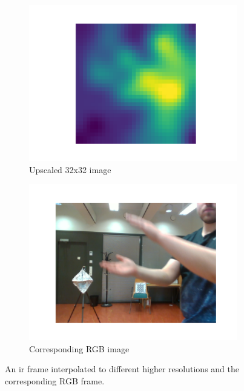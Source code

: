 \begin{figure}[H]
\begin{subfigure}[b]{0.475\textwidth}
        \centering
        \includegraphics[width=\textwidth]{fig/4/ir32.pdf}
        \caption{Upscaled 32x32 image}
        \label{fig:ir-interp-4x}
    \end{subfigure}
    \hfill
    \begin{subfigure}[b]{0.475\textwidth}
        \centering
        \includegraphics[width=\textwidth]{fig/4/ir-rgb.pdf}
        \caption{Corresponding RGB image}
        \label{fig:ir-rgb}
    \end{subfigure}
    \caption{An \gls{ir} frame interpolated to different higher resolutions and the corresponding RGB frame.}
    \label{fig:ir-interpolated}
\end{figure}

